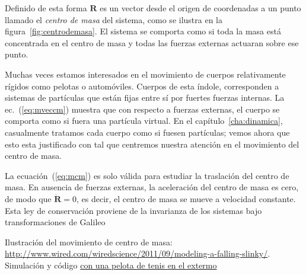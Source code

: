 Definido de esta forma $\mathbf{R}$ es un vector desde el origen de coordenadas a un punto llamado el \emph{centro de masa} del sistema, como se ilustra en la figura~\ref{fig:centrodemasa}. El sistema se comporta como si toda la masa está concentrada en el centro de masa y todas las fuerzas externas actuaran sobre ese punto.

Muchas veces estamos interesados en el movimiento de cuerpos relativamente rígidos como pelotas o automóviles. Cuerpos de esta índole, corresponden a sistemas de partículas que están fijas entre sí por fuertes fuerzas internas. La ec.~(\ref{eq:mveccm}) muestra que con respecto a fuerzas externas, el cuerpo se comporta como si fuera una partícula virtual. En el capítulo~\ref{cha:dinamica}, casualmente tratamos cada cuerpo como si fuesen partículas; vemos ahora que esto esta justificado con tal que centremos nuestra atención en el movimiento del centro de masa. 

La ecuación~(\ref{eq:mcm}) es solo válida para estudiar la traslación del centro de masa. En ausencia de fuerzas externas, la aceleración del centro de masa es cero, de modo que $\ddot{\mathbf{R}}=0$, es decir, el centro de masa se mueve a velocidad constante. Esta ley de conservación proviene de la invarianza de los sistemas bajo transformaciones de Galileo

Ilustración del movimiento de centro de masa: \url{http://www.wired.com/wiredscience/2011/09/modeling-a-falling-slinky/}. Simulación y código  \href{http://www.wired.com/wiredscience/2011/10/more-slinky-physics/}{con una pelota de tenis en el extermo}

